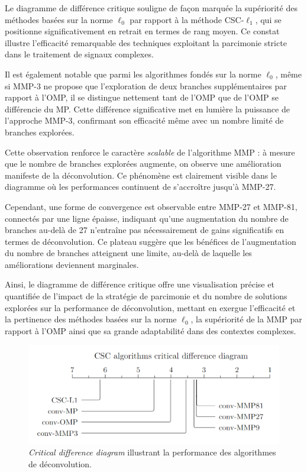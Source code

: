\documentclass[9pt,a4paper,twoside]{rho}
\begin{document}
Le diagramme de différence critique souligne de façon marquée la supériorité des méthodes basées sur la norme \(\ell_0\) par rapport à la méthode CSC-\(\ell_1\), qui se positionne significativement en retrait en termes de rang moyen. Ce constat illustre l'efficacité remarquable des techniques exploitant la parcimonie stricte dans le traitement de signaux complexes.

Il est également notable que parmi les algorithmes fondés sur la norme \(\ell_0\), même si MMP-3 ne propose que l'exploration de deux branches supplémentaires par rapport à l'OMP, il se distingue nettement tant de l'OMP que de l'OMP se différencie du MP. Cette différence significative met en lumière la puissance de l'approche MMP-3, confirmant son efficacité même avec un nombre limité de branches explorées.

Cette observation renforce le caractère \textit{scalable} de l'algorithme MMP : à mesure que le nombre de branches explorées augmente, on observe une amélioration manifeste de la déconvolution. Ce phénomène est clairement visible dans le diagramme où les performances continuent de s'accroître jusqu'à MMP-27.

Cependant, une forme de convergence est observable entre MMP-27 et MMP-81, connectés par une ligne épaisse, indiquant qu'une augmentation du nombre de branches au-delà de 27 n'entraîne pas nécessairement de gains significatifs en termes de déconvolution. Ce plateau suggère que les bénéfices de l'augmentation du nombre de branches atteignent une limite, au-delà de laquelle les améliorations deviennent marginales.

Ainsi, le diagramme de différence critique offre une visualisation précise et quantifiée de l'impact de la stratégie de parcimonie et du nombre de solutions explorées sur la performance de déconvolution, mettant en exergue l'efficacité et la pertinence des méthodes basées sur la norme \(\ell_0\), la supériorité de la MMP par rapport à l'OMP ainsi que sa grande adaptabilité dans des contextes complexes.

\begin{figure}[H]
    \centering
    \includegraphics[width=1\linewidth]{images/critical_difference_diagram.png}
    \caption{\textit{Critical difference diagram} illustrant la performance des algorithmes de déconvolution.}
    \label{fig:cdd}
\end{figure}
\end{document}
